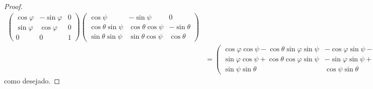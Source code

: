 \begin{proof}
\begin{align*}
\begin{pmatrix}
            \cos\varphi & -\sin\varphi & 0\\
            \sin\varphi & \cos\varphi & 0\\
            0 & 0 & 1
        \end{pmatrix}
        \begin{pmatrix}
            \cos\psi & -\sin\psi & 0\\
            \cos\theta \sin\psi & \cos\theta \cos\psi & -\sin\theta\\
            \sin\theta \sin \psi & \sin\theta \cos\psi& \cos\theta
        \end{pmatrix}\\
                  &= \begin{pmatrix}
            \cos\varphi \cos\psi - \cos\theta\sin\varphi\sin\psi & - \cos\varphi\sin\psi - \cos\theta \sin\varphi\cos\psi & \sin\varphi \sin\theta\\
            \sin\varphi \cos\psi + \cos\theta \cos\varphi \sin\psi &-\sin\varphi\sin\psi + \cos\theta \cos\varphi \cos\psi & - \cos\varphi \sin\theta\\
            \sin\psi \sin\theta & \cos\psi\sin\theta & \cos\theta
        \end{pmatrix},
    \end{align*}
    como desejado.
\end{proof}
